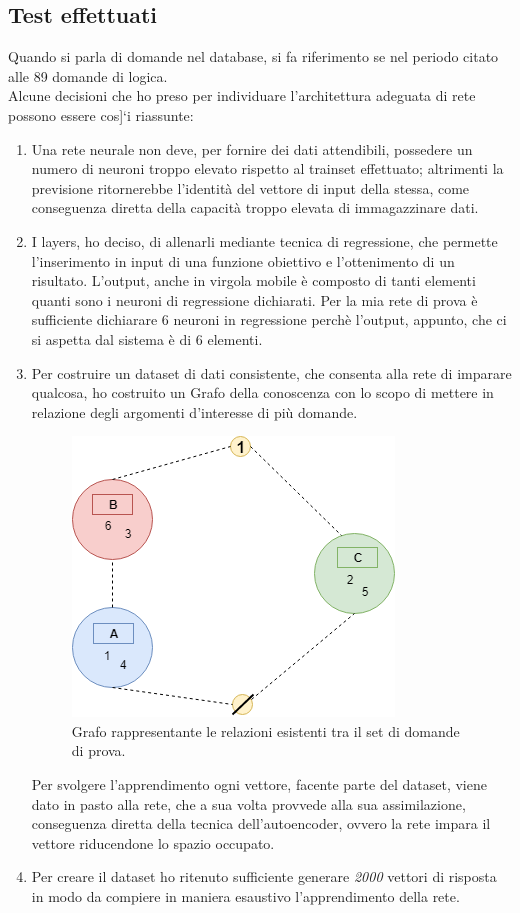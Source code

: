\subsection{Test effettuati}
\label{Test effettuati}
Quando si parla di domande nel database, si fa riferimento se nel periodo citato alle 89 domande di logica.\\
Alcune decisioni che ho preso per individuare l'architettura adeguata di rete possono essere cos]`i riassunte:
\begin{enumerate}
\item Una rete neurale non deve, per fornire dei dati attendibili, possedere un numero di neuroni troppo elevato rispetto al trainset effettuato; altrimenti la previsione  ritornerebbe l'identit\`a del vettore di input della stessa, come conseguenza diretta della capacit\`a troppo elevata di immagazzinare dati.
\item I layers, ho deciso, di allenarli mediante tecnica di regressione, che permette l'inserimento in input di una funzione obiettivo e l'ottenimento di un risultato. L'output, anche in virgola mobile \`e composto di tanti elementi quanti sono i neuroni di regressione dichiarati. Per la mia rete di prova \`e sufficiente dichiarare  6 neuroni in regressione perch\`e l'output, appunto, che ci si aspetta dal sistema \`e di 6 elementi.
\item Per costruire un dataset di dati consistente, che consenta alla rete di imparare qualcosa, ho costruito un Grafo della conoscenza con lo scopo di mettere in relazione degli argomenti d'interesse di pi\`u domande.
\begin{figure}[H]
\centering
	\includegraphics[width=0.60\linewidth]{./image/grafo_trainset.png}
	\caption{Grafo rappresentante le relazioni esistenti tra il set di domande di prova.}
	\label{Grafo rappresentante le relazioni esistenti tra il set di domande di prova.}
\end{figure}
\noindent
Per svolgere l'apprendimento ogni vettore, facente parte del dataset, viene dato in pasto alla rete, che a sua volta provvede alla sua assimilazione, conseguenza diretta della tecnica dell'autoencoder, ovvero la rete impara il vettore riducendone lo spazio occupato.
\item Per creare il dataset ho ritenuto sufficiente generare \textit{2000} vettori di risposta in modo da compiere in maniera esaustivo l'apprendimento della rete.
\end{enumerate}
